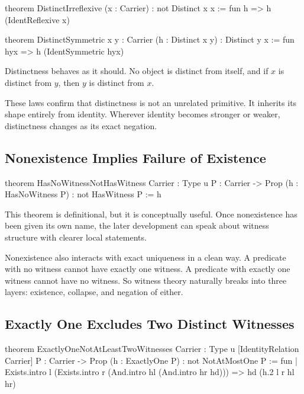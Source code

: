 \documentclass[11pt]{article}
\begin{document}
\begin{leanblock}
theorem DistinctIrreflexive (x : Carrier) : not Distinct x x :=
  fun h => h (IdentReflexive x)

theorem DistinctSymmetric {x y : Carrier} (h : Distinct x y) : Distinct y x :=
  fun hyx => h (IdentSymmetric hyx)
\end{leanblock}

Distinctness behaves as it should. No object is distinct from itself, and if \(x\) is distinct from \(y\), then \(y\) is distinct from \(x\).

These laws confirm that distinctness is not an unrelated primitive. It inherits its shape entirely from identity. Wherever identity becomes stronger or weaker, distinctness changes as its exact negation.

\subsection{Nonexistence Implies Failure of Existence}

\begin{leanblock}
theorem HasNoWitnessNotHasWitness {Carrier : Type u} {P : Carrier -> Prop}
    (h : HasNoWitness P) : not HasWitness P :=
  h
\end{leanblock}

This theorem is definitional, but it is conceptually useful. Once nonexistence has been given its own name, the later development can speak about witness structure with clearer local statements.

Nonexistence also interacts with exact uniqueness in a clean way. A predicate with no witness cannot have exactly one witness. A predicate with exactly one witness cannot have no witness. So witness theory naturally breaks into three layers: existence, collapse, and negation of either.

\subsection{Exactly One Excludes Two Distinct Witnesses}

\begin{leanblock}
theorem ExactlyOneNotAtLeastTwoWitnesses
    {Carrier : Type u} [IdentityRelation Carrier]
    {P : Carrier -> Prop} (h : ExactlyOne P) : not NotAtMostOne P :=
  fun
    | Exists.intro l
        (Exists.intro r (And.intro hl (And.intro hr hd))) =>
          hd (h.2 l r hl hr)
\end{leanblock}
\end{document}
